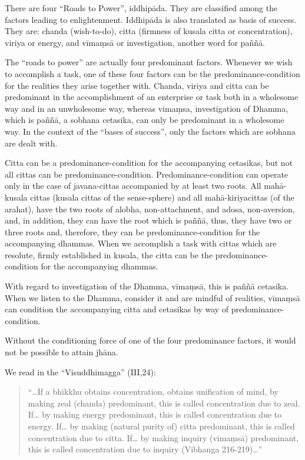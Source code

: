 There are four ``Roads to Power'', iddhipāda. They are classified among
the factors leading to enlightenment. Iddhipāda is also translated as
basis of success. They are: chanda (wish-to-do), citta (firmness of
kusala citta or concentration), viriya or energy, and vīmaṃsā or
investigation, another word for paññā.

The ``roads to power'' are actually four predominant factors. Whenever
we wish to accomplish a task, one of these four factors can be the
predominance-condition for the realities they arise together with.
Chanda, viriya and citta can be predominant in the accomplishment of an
enterprise or task both in a wholesome way and in an unwholesome way,
whereas vimaṃsa, investigation of Dhamma, which is paññā, a sobhana
cetasika, can only be predominant in a wholesome way. In the context of
the ``bases of success'', only the factors which are sobhana are dealt
with.

Citta can be a predominance-condition for the accompanying cetasikas,
but not all cittas can be predominance-condition. Predominance-condition
can operate only in the case of javana-cittas accompanied by at least
two roots. All mahā-kusala cittas (kusala cittas of the sense-sphere)
and all mahā-kiriyacittas (of the arahat), have the two roots of alobha,
non-attachment, and adosa, non-aversion, and, in addition, they can have
the root which is paññā, thus, they have two or three roots and,
therefore, they can be predominance-condition for the accompanying
dhammas. When we accomplish a task with cittas which are resolute,
firmly established in kusala, the citta can be the
predominance-condition for the accompanying dhammas.

With regard to investigation of the Dhamma, vīmaṃsā, this is paññā
cetasika. When we listen to the Dhamma, consider it and are mindful of
realities, vīmaṃsā can condition the accompanying citta and cetasikas by
way of predominance-condition.

Without the conditioning force of one of the four predominance factors,
it would not be possible to attain jhāna.

We read in the ``Visuddhimagga'' (III,24):

\begin{quote}
``\ldots{}If a bhikkhu obtains concentration, obtains unification of
mind, by making zeal (chanda) predominant, this is called concentration
due to zeal. If\ldots{} by making energy predominant, this is called
concentration due to energy. If\ldots{} by making (natural purity of)
citta predominant, this is called concentration due to citta. If\ldots{}
by making inquiry (vimaṃsā) predominant, this is called concentration
due to inquiry (Vibhanga 216-219)\ldots{}''
\end{quote}

